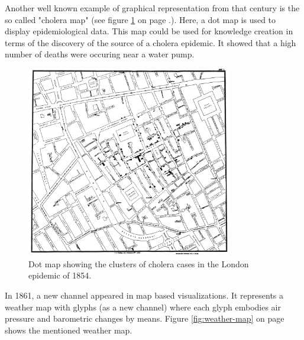 Another well known example of graphical representation from that century is the so called "cholera map" (see figure \ref{fig:cholera-map} on page \pageref{fig:cholera-map}.). Here, a dot map is used to display epidemiological data. This map could be used for knowledge creation in terms of the discovery of the source of a cholera epidemic. It showed that a high number of deaths were occuring near a water pump.

\begin{figure}[!htb]
\centering
\includegraphics[width=0.8\textwidth,keepaspectratio]{images/history/cholera.jpg}
\caption[
    Dot map showing the clusters of cholera cases in the London epidemic of 1854., Urldate: 07.2016 \newline
\small\texttt{\url{https://upload.wikimedia.org/wikipedia/commons/2/27/Snow-cholera-map-1.jpg}}
]{Dot map showing the clusters of cholera cases in the London epidemic of 1854.}
\label{fig:cholera-map}
\end{figure}

In 1861, a new channel appeared in map based visualizations. It represents a weather map with glyphs (as a new channel) where each glyph embodies air pressure and barometric changes by means. Figure \ref{fig:weather-map} on page \pageref{fig:weather-map} shows the mentioned weather map.

